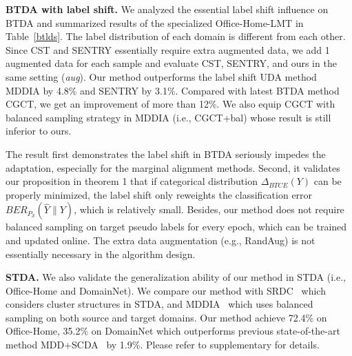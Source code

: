 \documentclass[letterpaper]{article} \usepackage{aaai23}  \usepackage{times}  \usepackage{helvet}  \usepackage{courier}  \usepackage[hyphens]{url}  \usepackage{graphicx} \urlstyle{rm} \def\UrlFont{\rm}  \usepackage{natbib}  \usepackage{caption} \frenchspacing  \setlength{\pdfpagewidth}{8.5in}  \setlength{\pdfpageheight}{11in}
\begin{document}
\noindent\textbf{BTDA with label shift.} We analyzed the essential label shift influence on BTDA and summarized results of the specialized Office-Home-LMT in Table~\ref{btlds}. The label distribution of each domain is different from each other. Since CST and SENTRY essentially require extra augmented data, we add 1 augmented data for each sample and evaluate CST, SENTRY, and ours in the same setting (\textit{aug}). Our method outperforms the label shift UDA method MDDIA by 4.8\% and SENTRY by 3.1\%. Compared with latest BTDA method CGCT, we get an improvement of more than 12\%. We also equip CGCT with balanced sampling strategy in MDDIA (i.e., CGCT+bal) whose result is still inferior to ours.


The result first demonstrates the label shift in BTDA seriously impedes the adaptation, especially for the marginal alignment methods. Second, it validates our proposition in theorem 1 that if categorical distribution $\Delta_{BTCE}(Y)$ can be properly minimized, the label shift only reweights the classification error $BER_{P_{\mathcal{S}}}(\hat{Y}\|Y)$, which is relatively small. Besides, our method does not require balanced sampling on target pseudo labels for every epoch, which can be trained and updated online. The extra data augmentation (e.g., RandAug) is not essentially necessary in the algorithm design.


\noindent\textbf{STDA.} We also validate the generalization ability of our method in STDA (i.e., Office-Home and DomainNet). We compare our method with SRDC~\cite{tang2020unsupervised} which considers cluster structures in STDA, and MDDIA~\cite{jiang2020implicit} which uses balanced sampling on both source and target domains. Our method achieve 72.4\% on Office-Home, 35.2\% on DomainNet which outperforms previous state-of-the-art method MDD+SCDA~\cite{li2021semantic} by 1.9\%. Please refer to supplementary for details.
\end{document}

